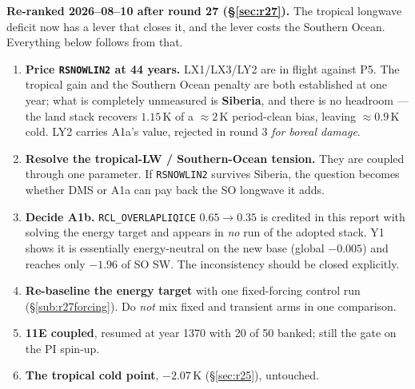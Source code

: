 \documentclass[10pt]{article}
\begin{document}
\textbf{Re-ranked 2026--08--10 after round 27 (\S\ref{sec:r27}).} The tropical longwave
deficit now has a lever that closes it, and the lever costs the Southern Ocean. Everything
below follows from that.
\begin{enumerate}\itemsep2pt
\item \textbf{Price \texttt{RSNOWLIN2} at 44 years.} LX1/LX3/LY2 are in flight against P5.
The tropical gain and the Southern Ocean penalty are both established at one year; what is
completely unmeasured is \textbf{Siberia}, and there is no headroom --- the land stack
recovers $1.15$\,K of a ${\approx}2$\,K period-clean bias, leaving ${\approx}0.9$\,K cold.
LY2 carries A1a's value, rejected in round 3 \emph{for boreal damage}.
\item \textbf{Resolve the tropical-LW / Southern-Ocean tension.} They are coupled through
one parameter. If \texttt{RSNOWLIN2} survives Siberia, the question becomes whether DMS or
A1a can pay back the SO longwave it adds.
\item \textbf{Decide A1b.} \texttt{RCL\_OVERLAPLIQICE} $0.65\to0.35$ is credited in this
report with solving the energy target and appears in \emph{no} run of the adopted stack.
Y1 shows it is essentially energy-neutral on the new base (global $-0.005$) and reaches
only $-1.96$ of SO SW. The inconsistency should be closed explicitly.
\item \textbf{Re-baseline the energy target} with one fixed-forcing control run
(\S\ref{sub:r27forcing}). Do \emph{not} mix fixed and transient arms in one comparison.
\item \textbf{11E coupled}, resumed at year 1370 with 20 of 50 banked; still the gate on
the PI spin-up.
\item \textbf{The tropical cold point}, $-2.07$\,K (\S\ref{sec:r25}), untouched.
\end{enumerate}
\end{document}
